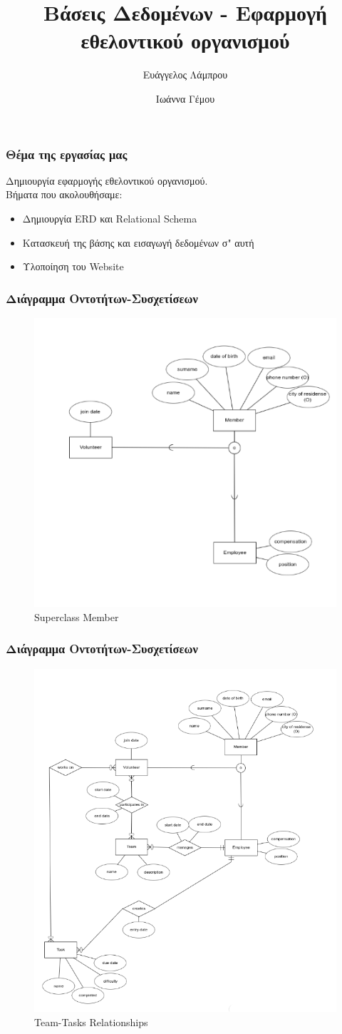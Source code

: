 \documentclass[pdf]{beamer}
\title{Βάσεις Δεδομένων - Εφαρμογή εθελοντικού οργανισμού}
\date{}
\author{Ευάγγελος Λάμπρου\and Ιωάννα Γέμου}
\newcommand{\en}[1]{\foreignlanguage{english}{#1}}
\begin{document}
\begin{frame}
  \maketitle
\end{frame}

\begin{frame}
  \frametitle{Θέμα της εργασίας μας}
  Δημιουργία εφαρμογής εθελοντικού οργανισμού.\\
  Βήματα που ακολουθήσαμε:
  \begin{itemize}
      \item Δημιουργία \en{ERD} και \en{Relational Schema}
      \item Κατασκευή της βάσης και εισαγωγή δεδομένων σ" αυτή
      \item Υλοποίηση του \en{Website} 
  \end{itemize}
  
\end{frame}

\begin{frame}
  \frametitle{Διάγραμμα Οντοτήτων-Συσχετίσεων}
  \begin{figure}
      \centering
      \includegraphics[width=.5\textwidth]{./images/member.png}
      \caption{\en{Superclass Member }}
  \end{figure}
  
  

\end{frame}


\begin{frame}
  \frametitle{Διάγραμμα Οντοτήτων-Συσχετίσεων}
  \begin{figure}
      \centering
      \includegraphics[width=.5\textwidth]{./images/team.png}
      \caption{\en{Team-Tasks Relationships}}
  \end{figure}

\end{frame}
\end{document}
